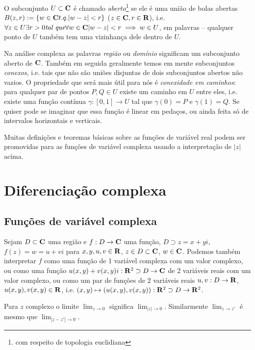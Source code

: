 O subconjunto $U \subset \mathbf{C}$ é chamado \emph{aberto}\footnote{com respeito de topologia euclidiana}
se ele é uma união de bolas abertas $B(z,r) := \{w\in \mathbf{C} t.q. |w-z|<r\}$ ($z\in\mathbf{C},r\in\mathbf{R}$), 
i.e. $\forall z\in U \exists r>0 \textit{tal que} \forall w\in\mathbf{C} |w-z|<r \implies w\in U$,
em palavras -- qualquer ponto de $U$ também tem uma vizinhança dele dentro de $U$.

Na análise complexa as palavras \emph{região} ou \emph{domínio} significam um subconjunto aberto de $\mathbf{C}$.
Também em seguida geralmente temos em mente subconjuntos \emph{conexos}, i.e. tais
que não são uniões disjuntas de dois subconjuntos abertos não vazios.
O propriedade que será mais útil para nós é \emph{conexidade em caminhos}:
para qualquer par de pontos $P,Q\in U$ existe um caminho em $U$ entre eles,
i.e. existe uma função contínua $\gamma: [0,1] \to U$ tal que $\gamma(0) = P$
e $\gamma(1)=Q$. Se quiser pode se imaginar que essa função é linear em pedaços,
ou ainda feita só de intervalos horizontais e verticais.

Muitas definições e teoremas básicas sobre as funções de variável real
podem ser promovidas para as funções de variável complexa usando
a interpretação de $|z|$ acima.

\section{Diferenciação complexa}

\subsection{Funções de variável complexa}

Sejam $D\subset \mathbf{C}$ uma região e $f : D \to \mathbf{C}$ uma função,
$D\supset z = x + yi$, $f(z) = w = u + v i$ para $x,y,u,v\in \mathbf{R}$, $z\in D\subset \mathbf{C}$, $w\in \mathbf{C}$.
Podemos também interpretar $f$ como uma função de 1 variável complexa com um valor complexo,
ou como uma função $u(x,y) + v(x,y) i : \mathbf{R}^2\supset D \to \mathbf{C}$ de $2$ variáveis reais com um valor complexo,
ou como um par de funções de $2$ variáveis reais
$u,v : D \to \mathbf{R}$, $u(x,y), v(x,y) \in \mathbf{R}$,
i.e. $(x,y) \mapsto (u(x,y),v(x,y)) : \mathbf{R}^2 \supset D \to \mathbf{R}^2$.

Para $z$ complexo o limite $\lim_{z\to 0}$ significa $\lim_{|z|\to 0}$.
Similarmente $\lim_{z\to z'}$ é mesmo que $\lim_{|z-z'|\to 0}$.

